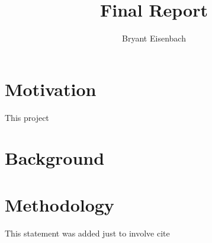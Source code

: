 \documentclass[titlepage]{article}
\author{Bryant Eisenbach}
\title{Final Report}
\begin{document}
\section{Motivation}
This project


\section{Background}


\section{Methodology}

\pagebreak

This statement was added just to involve cite \cite{pyimagesearch}

{}

\end{document}
